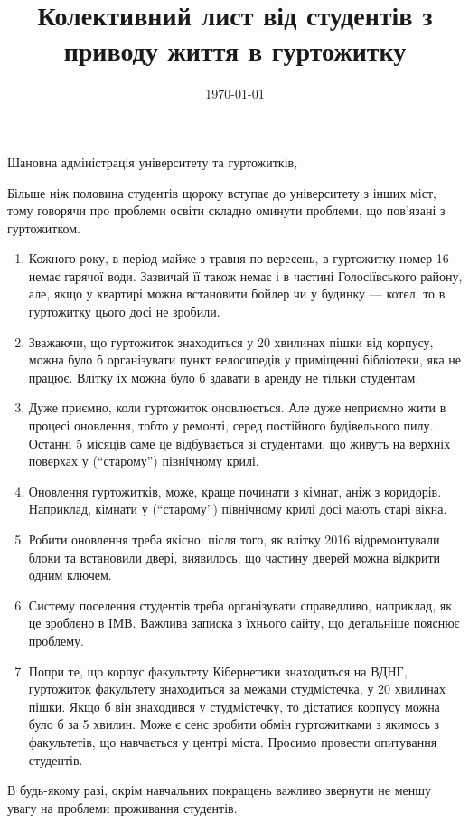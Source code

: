 \documentclass[14pt, a4paper]{extarticle}  %
\title{Колективний лист від студентів з приводу життя в гуртожитку}
\date{\today}
\begin{document}
\maketitle

Шановна адміністрація університету та гуртожитків, 

Більше ніж половина студентів щороку вступає до університету з інших міст, тому говорячи про проблеми освіти складно оминути проблеми, що пов'язані з гуртожитком. 
\begin{enumerate}
	\item Кожного року, в період майже з травня по вересень, в гуртожитку номер 16 немає гарячої води. Зазвичай її також немає і в частині Голосіївського району, але, якщо у квартирі можна встановити бойлер чи у будинку --- котел, то в гуртожитку цього досі не зробили. 
	\item Зважаючи, що гуртожиток знаходиться у 20 хвилинах пішки від корпусу, можна було б організувати пункт велосипедів у приміщенні бібліотеки, яка не працює. Влітку їх можна було б здавати в аренду не тільки студентам. 
	\item Дуже приємно, коли гуртожиток оновлюється. Але дуже неприємно жити в процесі оновлення, тобто у ремонті, серед постійного будівельного пилу. Останні 5 місяців саме це відбувається зі студентами, що живуть на верхніх поверхах у (``старому'') північному крилі. 
	\item Оновлення гуртожитків, може, краще починати з кімнат, аніж з коридорів. Наприклад, кімнати у (``старому'') північному крилі досі мають старі вікна.
	\item Робити оновлення треба якісно: після того, як влітку 2016 відремонтували блоки та встановили двері, виявилось, що частину дверей можна відкрити одним ключем. 
	\item Систему поселення студентів треба організувати справедливо, наприклад, як це зроблено в \href{https://dorms.online/}{ІМВ}. \href{https://docs.google.com/document/d/1Z2BHe0A4EmTV-15ywfvJOvfqsr-1LhsP0BfDYz7UGbw/edit}{Важлива записка} з їхнього сайту, що детальніше пояснює проблему. 
	\item Попри те, що корпус факультету Кібернетики знаходиться на ВДНГ, гуртожиток факультету знаходиться за межами студмістечка, у 20 хвилинах пішки. Якщо б він знаходився у студмістечку, то дістатися корпусу можна було б за 5 хвилин. Може є сенс зробити обмін гуртожитками з якимось з факультетів, що навчається у центрі міста. Просимо провести опитування студентів. 
\end{enumerate}

В будь-якому разі, окрім навчальних покращень важливо звернути не меншу увагу на проблеми проживання студентів.
\end{document}

